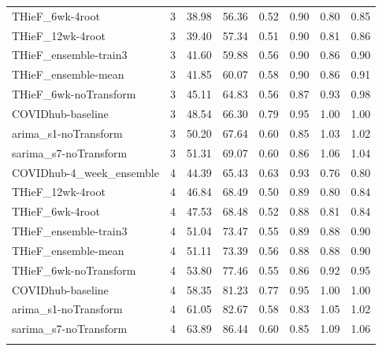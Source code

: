 \documentclass[thesis]{umassthesis}  %
\begin{document}
\begin{longtable}{lrrrrrrr}
  THieF\_6wk-4root & 3 & 38.98 & 56.36 & 0.52 & 0.90 & 0.80 & 0.85 \\ 
  THieF\_12wk-4root & 3 & 39.40 & 57.34 & 0.51 & 0.90 & 0.81 & 0.86 \\ 
  THieF\_ensemble-train3 & 3 & 41.60 & 59.88 & 0.56 & 0.90 & 0.86 & 0.90 \\ 
  THieF\_ensemble-mean & 3 & 41.85 & 60.07 & 0.58 & 0.90 & 0.86 & 0.91 \\ 
  THieF\_6wk-noTransform & 3 & 45.11 & 64.83 & 0.56 & 0.87 & 0.93 & 0.98 \\ 
  COVIDhub-baseline & 3 & 48.54 & 66.30 & 0.79 & 0.95 & 1.00 & 1.00 \\ 
  arima\_s1-noTransform & 3 & 50.20 & 67.64 & 0.60 & 0.85 & 1.03 & 1.02 \\ 
  sarima\_s7-noTransform & 3 & 51.31 & 69.07 & 0.60 & 0.86 & 1.06 & 1.04 \\ 
  COVIDhub-4\_week\_ensemble & 4 & 44.39 & 65.43 & 0.63 & 0.93 & 0.76 & 0.80 \\ 
  THieF\_12wk-4root & 4 & 46.84 & 68.49 & 0.50 & 0.89 & 0.80 & 0.84 \\ 
  THieF\_6wk-4root & 4 & 47.53 & 68.48 & 0.52 & 0.88 & 0.81 & 0.84 \\ 
  THieF\_ensemble-train3 & 4 & 51.04 & 73.47 & 0.55 & 0.89 & 0.88 & 0.90 \\ 
  THieF\_ensemble-mean & 4 & 51.11 & 73.39 & 0.56 & 0.88 & 0.88 & 0.90 \\ 
  THieF\_6wk-noTransform & 4 & 53.80 & 77.46 & 0.55 & 0.86 & 0.92 & 0.95 \\ 
  COVIDhub-baseline & 4 & 58.35 & 81.23 & 0.77 & 0.95 & 1.00 & 1.00 \\ 
  arima\_s1-noTransform & 4 & 61.05 & 82.67 & 0.58 & 0.83 & 1.05 & 1.02 \\ 
  sarima\_s7-noTransform & 4 & 63.89 & 86.44 & 0.60 & 0.85 & 1.09 & 1.06 \\ 
   \hline
\hline
\label{tab:table_horizon_states}
\end{longtable}
\endgroup

\newpage
\end{document}
